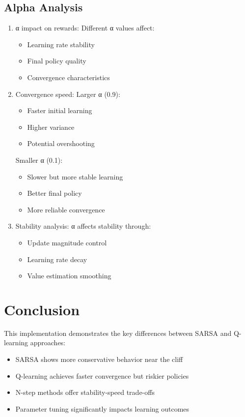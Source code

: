 \documentclass{article}
\begin{document}
\subsection{Alpha Analysis}
\begin{enumerate}[label=(\arabic*)]
\item α impact on rewards:
Different α values affect:
\begin{itemize}
    \item Learning rate stability
    \item Final policy quality
    \item Convergence characteristics
\end{itemize}

\item Convergence speed:
Larger α (0.9):
\begin{itemize}
    \item Faster initial learning
    \item Higher variance
    \item Potential overshooting
\end{itemize}

Smaller α (0.1):
\begin{itemize}
    \item Slower but more stable learning
    \item Better final policy
    \item More reliable convergence
\end{itemize}

\item Stability analysis:
α affects stability through:
\begin{itemize}
    \item Update magnitude control
    \item Learning rate decay
    \item Value estimation smoothing
\end{itemize}
\end{enumerate}

\section{Conclusion}
This implementation demonstrates the key differences between SARSA and Q-learning approaches:
\begin{itemize}
    \item SARSA shows more conservative behavior near the cliff
    \item Q-learning achieves faster convergence but riskier policies
    \item N-step methods offer stability-speed trade-offs
    \item Parameter tuning significantly impacts learning outcomes
\end{itemize}
\end{document}
